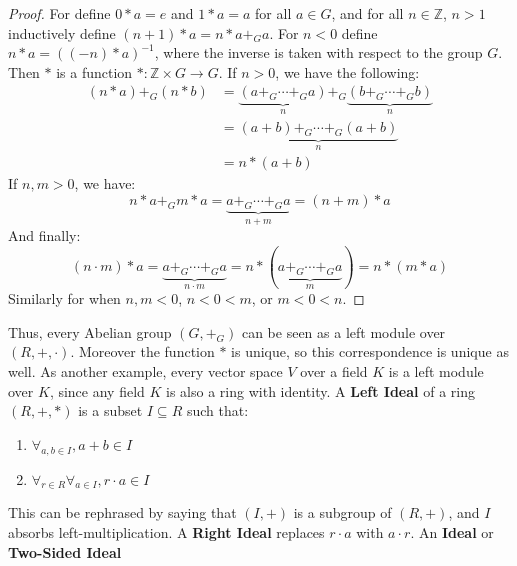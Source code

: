     \begin{proof}
        For define $0*a=e$ and $1*a=a$ for all $a\in{G}$,
        and for all
        $n\in\mathbb{Z}$, $n>1$ inductively define
        $(n+1)*a=n*a+_{G}a$. For $n<0$ define
        $n*a=((-n)*a)^{-1}$, where the inverse is taken
        with respect to the group $G$. Then $*$ is a function
        $*:\mathbb{Z}\times{G}\rightarrow{G}$. If $n>0$, we
        have the following:
        \begin{align*}
            (n*a)+_{G}(n*b)
            &=\underset{n}{\underbrace{(a+_{G}\cdots+_{G}a)}}
            +_{G}
            \underset{n}{\underbrace{(b+_{G}\cdots+_{G}b)}}\\
            &=\underset{n}
                {\underbrace{(a+b)+_{G}\cdots+_{G}(a+b)}}\\
            &=n*(a+b)
        \end{align*}
        If $n,m>0$, we have:
        \begin{equation*}
            n*a+_{G}m*a
            =\underset{n+m}{\underbrace{a+_{G}\cdots+_{G}a}}
            =(n+m)*a
        \end{equation*}
        And finally:
        \begin{equation*}
            (n\cdot{m})*a=
            \underset{n\cdot{m}}
                {\underbrace{a+_{G}\cdots+_{G}a}}
            =n*(\underset{m}{\underbrace{a+_{G}\cdots+_{G}a}})
            =n*(m*a)
        \end{equation*}
        Similarly for when $n,m<0$, $n<0<m$, or $m<0<n$.
    \end{proof}
    Thus, every Abelian group $(G,+_{G})$ can be seen
    as a left module over $(R,+,\cdot)$. Moreover the
    function $*$ is unique, so this correspondence is
    unique as well. As another example, every vector space
    $V$ over a field $K$ is a left module over $K$, since
    any field $K$ is also a ring with identity.
    A \textbf{Left Ideal} of a ring $(R,+,*)$ is a subset
    $I\subseteq{R}$ such that:
    \begin{enumerate}
        \item $\forall_{a,b\in{I}},a+b\in{I}$
        \item $\forall_{r\in{R}}\forall_{a\in{I}},r\cdot{a}\in{I}$
    \end{enumerate}
    This can be rephrased by saying that $(I,+)$ is a subgroup
    of $(R,+)$, and $I$ absorbs left-multiplication. A
    \textbf{Right Ideal} replaces $r\cdot{a}$ with
    $a\cdot{r}$. An \textbf{Ideal} or \textbf{Two-Sided Ideal}
